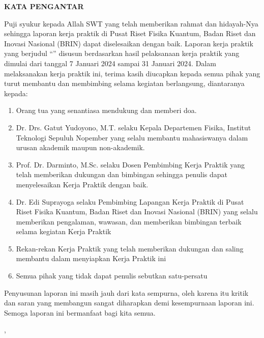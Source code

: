 
\begin{center}
    {\textbf{KATA PENGANTAR}}
    \pagestyle{fancy}
\end{center}

Puji syukur kepada Allah SWT yang telah memberikan rahmat dan hidayah-Nya sehingga laporan kerja praktik di Pusat Riset Fisika Kuantum, Badan Riset dan Inovasi Nasional (BRIN) dapat diselesaikan dengan baik. Laporan kerja praktik yang berjudul “\judulTA” disusun berdasarkan hasil pelaksanaan kerja praktik yang dimulai dari tanggal 7 Januari 2024 sampai 31 Januari 2024. Dalam melaksanakan kerja praktik ini, terima kasih diucapkan kepada semua pihak yang turut membantu dan membimbing selama kegiatan berlangsung, diantaranya kepada:
\begin{enumerate}
    \item Orang tua yang senantiasa mendukung dan memberi doa.
    \item Dr. Drs. Gatut Yudoyono, M.T. selaku Kepala Departemen Fisika, Institut Teknologi Sepuluh Nopember yang selalu membantu mahasiswanya dalam urusan akademik maupun non-akademik.
    \item Prof. Dr. Darminto, M.Sc. selaku Dosen Pembimbing Kerja Praktik yang telah memberikan dukungan dan bimbingan sehingga penulis dapat menyelesaikan Kerja Praktik dengan baik.
    \item Dr. Edi Suprayoga selaku Pembimbing Lapangan Kerja Praktik di Pusat Riset Fisika Kuantum, Badan Riset dan Inovasi Nasional (BRIN) yang selalu memberikan pengalaman, wawasan, dan memberikan bimbingan terbaik selama kegiatan Kerja Praktik
    \item Rekan-rekan Kerja Praktik yang telah memberikan dukungan dan saling membantu dalam menyiapkan Kerja Praktik ini
    \item Semua pihak yang tidak dapat penulis sebutkan satu-persatu
\end{enumerate}
Penyusunan laporan ini masih jauh dari kata sempurna, oleh karena itu kritik dan saran yang membangun sangat diharapkan demi kesempurnaan laporan ini. Semoga laporan ini bermanfaat bagi kita semua.
\vspace{6mm}

\begin{flushright}

\namaKota, \tanggalPengesahan

\vspace{15mm}

\namaMahasiswa

\end{flushright}

\newpage